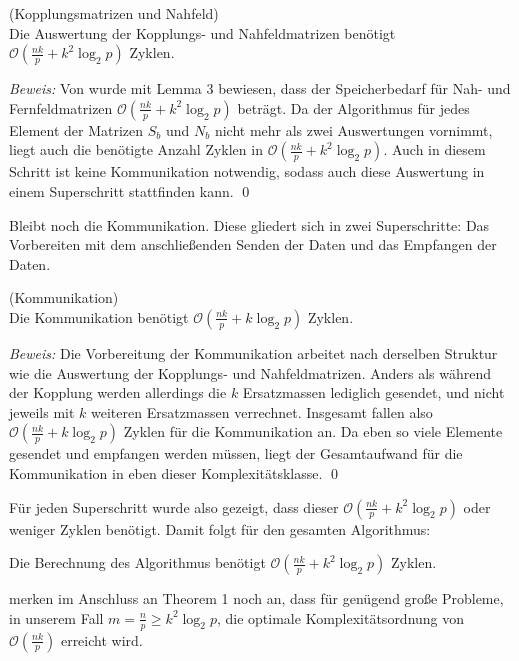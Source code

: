   \begin{lem}
  \label{lem:koppl}
    (Kopplungsmatrizen und Nahfeld)\\
    Die Auswertung der Kopplungs- und Nahfeldmatrizen benötigt $\mathcal{O}(\frac{nk}{p} + k^2 \log_2p)$ Zyklen.
  \end{lem}

  \textit{Beweis:}
  Von \citet{distrh2} wurde mit Lemma 3 bewiesen, dass der Speicherbedarf für Nah- und Fernfeldmatrizen $\mathcal{O}(\frac{nk}{p} + k^2 \log_2p)$ beträgt. Da der Algorithmus für jedes Element der 
  Matrizen $S_b$ und $N_b$ nicht mehr als zwei Auswertungen vornimmt, liegt auch die benötigte Anzahl Zyklen in $\mathcal{O}(\frac{nk}{p} + k^2 \log_2p)$. Auch in diesem Schritt ist keine Kommunikation
  notwendig, sodass auch diese Auswertung in einem Superschritt stattfinden kann. \qed
  
  Bleibt noch die Kommunikation. Diese gliedert sich in zwei Superschritte: Das Vorbereiten mit dem anschließenden Senden der Daten und das Empfangen der Daten. 
  
  \begin{lem}
    (Kommunikation)\\
    Die Kommunikation benötigt $\mathcal{O}(\frac{nk}{p} + k \log_2p)$ Zyklen.
  \end{lem}

  \textit{Beweis:}
  Die Vorbereitung der Kommunikation arbeitet nach derselben Struktur wie die Auswertung der Kopplungs- und Nahfeldmatrizen. Anders als während der Kopplung werden allerdings die $k$ Ersatzmassen
  lediglich gesendet, und nicht jeweils mit $k$ weiteren Ersatzmassen verrechnet. Insgesamt fallen also $\mathcal{O}(\frac{nk}{p} + k \log_2p)$ Zyklen für die Kommunikation
  an. Da eben so viele Elemente gesendet und empfangen werden müssen, liegt der Gesamtaufwand für die Kommunikation in eben dieser Komplexitätsklasse. \qed
  
  Für jeden Superschritt wurde also gezeigt, dass dieser $\mathcal{O}(\frac{nk}{p} + k^2 \log_2p)$ oder weniger Zyklen benötigt. Damit folgt für den gesamten Algorithmus:
  
  \begin{thm}
    Die Berechnung des Algorithmus benötigt $\mathcal{O}(\frac{nk}{p} + k^2 \log_2p)$ Zyklen.
  \end{thm}
  
  \citet{distrh2} merken im Anschluss an Theorem 1 noch an, dass  für genügend große Probleme, in unserem Fall $m = \frac{n}{p} \geq k^2 \log_2p$, die optimale Komplexitätsordnung von
  $\mathcal{O}(\frac{nk}{p})$ erreicht wird.
  
